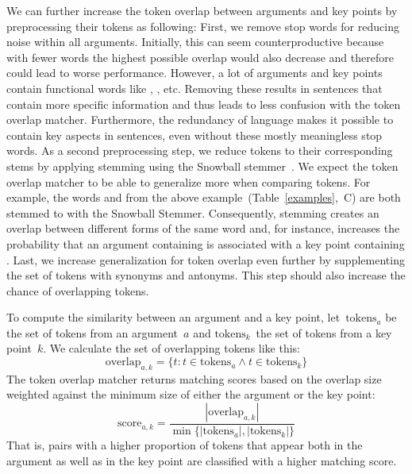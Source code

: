 We can further increase the token overlap between arguments and key points by preprocessing their tokens as following:
First, we remove stop words for reducing noise within all arguments.
Initially, this can seem counterproductive because with fewer words the highest possible overlap would also decrease and 
therefore could lead to worse performance.
However, a lot of arguments and key points contain functional words like , ,  etc.
Removing these results in sentences that contain more specific information and thus leads to less confusion with the token overlap matcher.
Furthermore, the redundancy of language makes it possible to contain key aspects in sentences, even without these mostly meaningless stop words.
As a second preprocessing step, we reduce tokens to their corresponding stems by applying stemming using the Snowball stemmer~\cite{Porter1980}. 
We expect the token overlap matcher to be able to generalize more when comparing tokens.
For example, the words  and  from the above example~(Table~\ref{examples},~C) 
are both stemmed to  with the Snowball Stemmer. 
Consequently, stemming creates an overlap between different forms of the same word and, for instance, increases the 
probability that an argument containing  is associated with a key point containing .
Last, we increase generalization for token overlap even further by supplementing the set of tokens with synonyms and antonyms. 
This step should also increase the chance of overlapping tokens.

To compute the similarity between an argument and a key point, let~\(\text{tokens}_a\) be the set of tokens from an 
argument~\(a\) and \(\text{tokens}_k\)~the set of tokens from a key point~\(k\).
We calculate the set of overlapping tokens like this:
\begin{equation}
    \text{overlap}_{a,k} = \{ t : t \in \text{tokens}_a \land t \in \text{tokens}_k \}
\end{equation}
The token overlap matcher returns matching scores based on the overlap size weighted against the minimum size of either 
the argument or the key point:
\begin{equation}
    \text{score}_{a,k} = \frac{ |\text{overlap}_{a,k}| }{ \min\{ |\text{tokens}_a|, |\text{tokens}_k| \} }
\end{equation}
That is, pairs with a higher proportion of tokens that appear both in the argument as well as in the key point are 
classified with a higher matching score.

